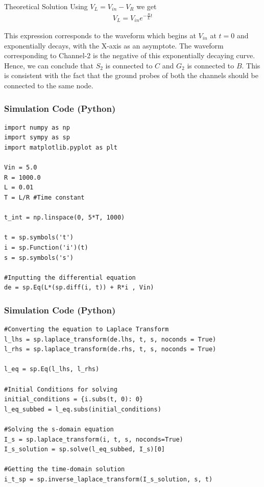 \documentclass{beamer}
\begin{document}

\begin{frame}{Theoretical Solution}
    Using $V_L = V_{in} - V_R$ we get
    \begin{align*}
        V_L = V_{in}e^{-\frac{R}{L}t}
    \end{align*}

This expression corresponds to the waveform which begins at $V_{in}$ at $t = 0$ and exponentially decays, with the X-axis as an asymptote. The waveform corresponding to Channel-2 is the negative of this exponentially decaying curve. \\
\noindent Hence, we can conclude that $S_2$ is connected to $C$ and $G_2$ is connected to $B$. 
This is consistent with the fact that the ground probes of both the channels should be connected to the same node. 
\vspace{0.3cm}

    
\end{frame}

\begin{frame}[fragile]
    \frametitle{Simulation Code (Python)}
    \begin{lstlisting}
import numpy as np
import sympy as sp
import matplotlib.pyplot as plt

Vin = 5.0
R = 1000.0
L = 0.01
T = L/R #Time constant

t_int = np.linspace(0, 5*T, 1000)

t = sp.symbols('t')
i = sp.Function('i')(t)
s = sp.symbols('s')

#Inputting the differential equation
de = sp.Eq(L*(sp.diff(i, t)) + R*i , Vin)

    \end{lstlisting}
 
    
\end{frame}

\begin{frame}[fragile]
    \frametitle{Simulation Code (Python)}
    \begin{lstlisting}
#Converting the equation to Laplace Transform
l_lhs = sp.laplace_transform(de.lhs, t, s, noconds = True)
l_rhs = sp.laplace_transform(de.rhs, t, s, noconds = True)

l_eq = sp.Eq(l_lhs, l_rhs)

#Initial Conditions for solving
initial_conditions = {i.subs(t, 0): 0}
l_eq_subbed = l_eq.subs(initial_conditions)

#Solving the s-domain equation
I_s = sp.laplace_transform(i, t, s, noconds=True)
I_s_solution = sp.solve(l_eq_subbed, I_s)[0]

#Getting the time-domain solution
i_t_sp = sp.inverse_laplace_transform(I_s_solution, s, t)

    \end{lstlisting}
 
    
\end{frame}
\end{document}
